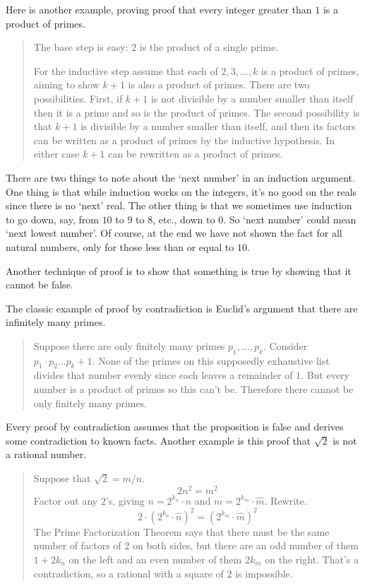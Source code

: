 Here is another example, proving
proof that every integer greater than \( 1 \) is a product
of primes.
\begin{quote}\small
The base step is easy: \( 2 \) is the product of a single prime.

For the inductive step assume that each of \( 2, 3,\ldots ,k \) is a
product of primes, aiming to show \( k+1 \) is also a product of
primes.
There are two possibilities.
First, if \( k+1 \) is not divisible by a number smaller than itself then it
is a prime and so is the product of primes.
The second possibility is that \( k+1 \) is divisible by a number
smaller than itself, and then its
factors can be written as a product of primes by the inductive hypothesis.
In either case
\( k+1 \) can be rewritten as a product of primes.
\end{quote}

There are two things to note about the `next number' in an induction
argument.
One thing is that while induction works on the integers, it's no good on the
reals since there is no `next' real.
The other thing is that we sometimes use induction to go down, say, from
\( 10 \) to \( 9 \) to \( 8 \), etc., down to \( 0 \).
So `next number' could mean `next lowest number'.
Of course, at the end we have not shown the fact for all natural numbers, only
for those less than or equal to \( 10 \).




Another technique of proof is
to show that something is true by showing that it cannot be false.

The classic example of proof by contradiction is Euclid's
argument that there are infinitely many primes.
\begin{quote}\small
Suppose there are only finitely many primes \( p_1,\dots,p_k \).
Consider \( p_1\cdot p_2\dots p_k +1 \).
None of the primes on this supposedly exhaustive list divides that number
evenly since each leaves a remainder of \( 1 \).
But every number is a product of primes so this can't be.
Therefore there cannot be only finitely many primes.
\end{quote}

Every proof by contradiction assumes that the proposition is
false and derives some contradiction to known facts.
Another example is this proof that
\( \sqrt{2} \) is not a rational number.
\begin{quote}\small
Suppose that  \( \sqrt{2}=m/n \).
\begin{equation*}
   2n^2=m^2
\end{equation*}
Factor out any \( 2 \)'s, giving
\( n=2^{k_n}\cdot \hat{n} \)
and
\( m=2^{k_m}\cdot \hat{m} \).
Rewrite.
\begin{equation*}
  2\cdot (2^{k_n}\cdot \hat{n})^2
  =
  (2^{k_m}\cdot \hat{m})^2
\end{equation*}
The Prime Factorization Theorem says that there must be the same number of
factors of \( 2 \) on both sides, but there are an odd number of them
\( 1+2k_n \) on the left and an even number of them \( 2k_m \) on the right.
That's a contradiction, so a rational with a square of
\( 2 \) is impossible.
\end{quote}

